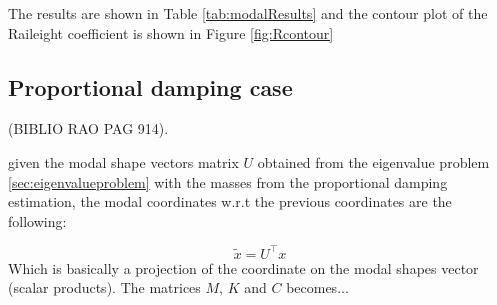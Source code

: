 \documentclass[twosided,a4paper]{article}           %
\newcommand{\tr}{^{{\bm \top}}}
\begin{document}
The results are shown in Table \ref{tab:modalResults} and the contour plot of the Raileight coefficient is shown in Figure \ref{fig:Rcontour}
\subsection{Proportional damping case}
 (BIBLIO RAO PAG 914).

given the modal shape vectors matrix $U$ obtained from the eigenvalue problem \ref{sec:eigenvalueproblem} with the masses from the proportional damping estimation, the modal coordinates w.r.t the previous coordinates are the following:

\begin{equation}
	\tilde{x} = U\tr x 
\end{equation}
 Which is basically a projection of the coordinate on the modal shapes vector (scalar products).
 The matrices $M$, $K$ and $C$ becomes... %
%



\end{document}
